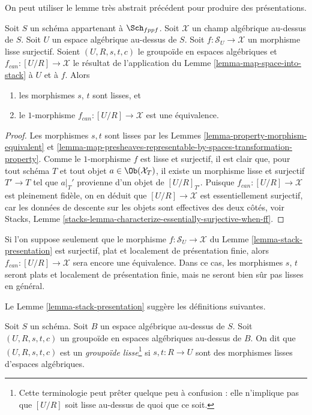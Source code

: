 \noindent
On peut utiliser le lemme très abstrait précédent pour produire des
présentations.

\begin{lemma}
\label{lemma-stack-presentation}
Soit $S$ un schéma appartenant à $\Sch_{fppf}$.
Soit $\mathcal{X}$ un champ algébrique au-dessus de $S$.
Soit $U$ un espace algébrique au-dessus de $S$.
Soit $f : \mathcal{S}_U \to \mathcal{X}$ un morphisme lisse surjectif.
Soient $(U, R, s, t, c)$ le groupoïde en espaces algébriques
et $f_{can} : [U/R] \to \mathcal{X}$ le résultat de l'application du
Lemme \ref{lemma-map-space-into-stack}
à $U$ et à $f$. Alors
\begin{enumerate}
\item les morphismes $s$, $t$ sont lisses, et
\item le $1$-morphisme $f_{can} : [U/R] \to \mathcal{X}$
est une équivalence.
\end{enumerate}
\end{lemma}

\begin{proof}
Les morphismes $s, t$ sont lisses par les
Lemmes \ref{lemma-property-morphism-equivalent} et
\ref{lemma-map-presheaves-representable-by-spaces-transformation-property}.
Comme le $1$-morphisme $f$ est lisse et
surjectif, il est clair que, pour tout schéma $T$ et tout objet
$a \in \Ob(\mathcal{X}_T)$, il existe un morphisme lisse et surjectif
$T' \to T$ tel que $a|_T'$ provienne d'un objet de
$[U/R]_{T'}$. Puisque $f_{can} : [U/R] \to \mathcal{X}$
est pleinement fidèle, on en déduit que
$[U/R] \to \mathcal{X}$ est essentiellement surjectif, car
les données de descente sur les objets sont effectives des deux côtés, voir
Stacks, Lemme \ref{stacks-lemma-characterize-essentially-surjective-when-ff}.
\end{proof}

\begin{remark}
\label{remark-flat-fp-presentation}
Si l'on suppose seulement que le morphisme $f : \mathcal{S}_U \to \mathcal{X}$ du
Lemme \ref{lemma-stack-presentation}
est surjectif, plat et localement de présentation finie, alors
$f_{can} : [U/R] \to \mathcal{X}$ sera encore une
équivalence. Dans ce cas, les morphismes $s$, $t$ seront plats et
localement de présentation finie, mais ne seront bien sûr pas lisses en général.
\end{remark}

\noindent
Le Lemme \ref{lemma-stack-presentation}
suggère les définitions suivantes.

\begin{definition}
\label{definition-smooth-groupoid}
Soit $S$ un schéma. Soit $B$ un espace algébrique au-dessus de $S$.
Soit $(U, R, s, t, c)$ un groupoïde en espaces algébriques au-dessus de $B$.
On dit que $(U, R, s, t, c)$ est un {\it groupoïde lisse}\footnote{Cette terminologie
peut prêter quelque peu à confusion : elle n'implique pas que $[U/R]$ soit lisse
au-dessus de quoi que ce soit.}
si $s, t : R \to U$ sont des morphismes lisses d'espaces algébriques.
\end{definition}

